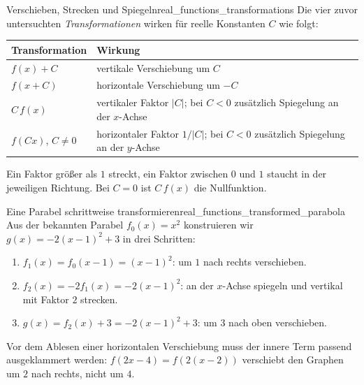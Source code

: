\par\medskip
\begin{TheoremBox}{Verschieben, Strecken und Spiegeln}{real_functions_transformations}
  Die vier zuvor untersuchten \emph{Transformationen}
   wirken für reelle Konstanten $C$ wie folgt:
  \begin{center}
    \renewcommand{\arraystretch}{1.5}
    \begin{tabular}{@{}lp{10.3cm}@{}}
      \toprule
      Transformation & Wirkung\\ \midrule
      $f(x)+C$ & vertikale Verschiebung um $C$\\
      $f(x+C)$ & horizontale Verschiebung um $-C$\\
      $C\,f(x)$ & vertikaler Faktor $|C|$;
        bei $C<0$ zusätzlich Spiegelung an der $x$-Achse\\
      $f(Cx)$, $C\ne0$ & horizontaler Faktor $1/|C|$;
        bei $C<0$ zusätzlich Spiegelung an der $y$-Achse\\
      \bottomrule
    \end{tabular}
  \end{center}
  Ein Faktor größer als $1$ streckt, ein Faktor zwischen $0$ und $1$ staucht
  in der jeweiligen Richtung. Bei $C=0$ ist $C\,f(x)$ die Nullfunktion.
\end{TheoremBox}
\begin{ExampleBox}{Eine Parabel schrittweise transformieren}{real_functions_transformed_parabola}
  Aus der bekannten Parabel $f_0(x)=x^2$ konstruieren wir
  $g(x)=-2(x-1)^2+3$ in drei Schritten:
  \begin{enumerate}[label=\arabic*.,leftmargin=*,itemsep=0.3\baselineskip,topsep=0.4\baselineskip]
    \item $f_1(x)=f_0(x-1)=(x-1)^2$: um $1$ nach rechts verschieben.
    \item $f_2(x)=-2f_1(x)=-2(x-1)^2$: an der $x$-Achse spiegeln
      und vertikal mit Faktor $2$ strecken.
    \item $g(x)=f_2(x)+3=-2(x-1)^2+3$: um $3$ nach oben verschieben.
  \end{enumerate}
  \par\medskip
  \par\smallskip
  {\centering
    \par}
  \par\medskip
\end{ExampleBox}

\par\medskip
Vor dem Ablesen einer horizontalen Verschiebung muss der innere Term
passend ausgeklammert werden:
$f(2x-4)=f(2(x-2))$ verschiebt den Graphen um $2$ nach rechts, nicht um $4$.